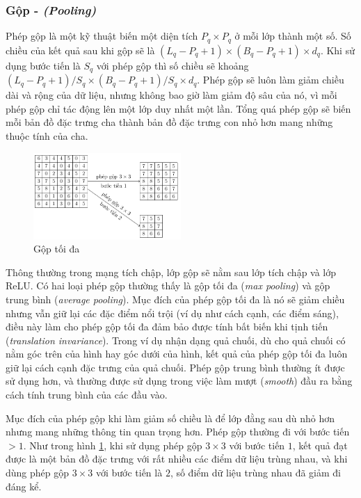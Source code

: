 \subsubsection{Gộp - \textit{(Pooling)}}
Phép gộp là một kỹ thuật biến một diện tích $P_q\times P_q$ ở mỗi lớp thành một số. Số chiều của kết quả sau khi gộp sẽ là $(L_q-P_q+1)\times (B_q-P_q+1)\times d_q$. Khi sử dụng bước tiến là $S_q$ với phép gộp thì số chiều sẽ khoảng $(L_q-P_q+1)/S_q\times (B_q-P_q+1)/S_q\times d_q$. Phép gộp sẽ luôn làm giảm chiều dài và rộng của dữ liệu, nhưng không bao giờ làm giảm độ sâu của nó, vì mỗi phép gộp chỉ tác động lên một lớp duy nhất một lần. Tổng quá phép gộp sẽ biến mỗi bản đồ đặc trưng cha thành bản đồ đặc trưng con nhỏ hơn mang những thuộc tính của cha.
\begin{figure}[htb]
    \centering
    \includegraphics[width=0.5\textwidth]{tikz_image/cnn_pooling.pdf}
    \caption[Gộp tối đa]{Gộp tối đa \cite{Aggarwal2023}}
    \label{figure:cnn-pooling}
\end{figure}

Thông thường trong mạng tích chập, lớp gộp sẽ nằm sau lớp tích chập và lớp ReLU. Có hai loại phép gộp thường thấy là gộp tối đa (\textit{max pooling}) và gộp trung bình (\textit{average pooling}). Mục đích của phép gộp tối đa là nó sẽ giảm chiều nhưng vẫn giữ lại các đặc điểm nổi trội (ví dụ như cách cạnh, các điểm sáng), điều này làm cho phép gộp tối đa đảm bảo được tính bất biến khi tịnh tiến (\textit{translation invariance}). Trong ví dụ nhận dạng quả chuối, dù cho quả chuối có nằm góc trên của hình hay góc dưới của hình, kết quả của phép gộp tối đa luôn giữ lại cách cạnh đặc trưng của quả chuối. Phép gộp trung bình thường ít được sử dụng hơn, và thường được sử dụng trong việc làm mượt (\textit{smooth}) đầu ra bằng cách tính trung bình của các đầu vào. \cite{Aggarwal2023}

Mục đích của phép gộp khi làm giảm số chiều là để lớp đằng sau dù nhỏ hơn nhưng mang những thông tin quan trọng hơn. Phép gộp thường đi với bước tiến $>1$. Như trong hình \ref{figure:cnn-pooling}, khi sử dụng phép gộp $3\times 3$ với bước tiến $1$, kết quả đạt được là một bản đồ đặc trưng với rất nhiều các điểm dữ liệu trùng nhau, và khi dùng phép gộp $3\times 3$ với bước tiến là $2$, số điểm dữ liệu trùng nhau đã giảm đi đáng kể.

